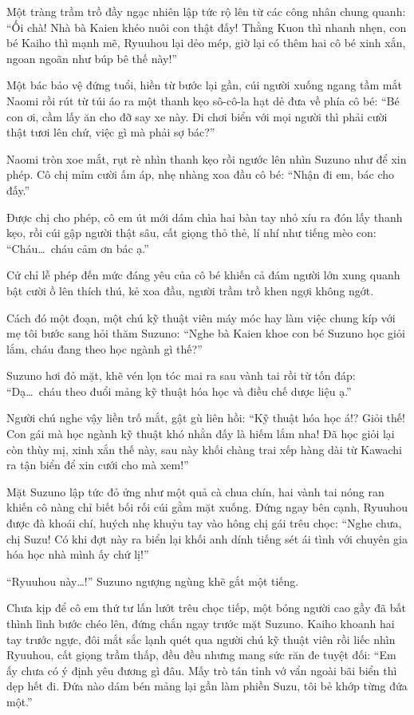 \documentclass[../main.tex]{subfiles}
\begin{document}
Một tràng trầm trồ đầy ngạc nhiên lập tức rộ lên từ các công nhân chung quanh: ``Ối chà! Nhà bà Kaien khéo nuôi con thật đấy! Thằng Kuon thì nhanh nhẹn, con bé Kaiho thì mạnh mẽ, Ryuuhou lại dẻo mép, giờ lại có thêm hai cô bé xinh xắn, ngoan ngoãn như búp bê thế này!''

Một bác bảo vệ đứng tuổi, hiền từ bước lại gần, cúi người xuống ngang tầm mắt Naomi rồi rút từ túi áo ra một thanh kẹo sô-cô-la hạt dẻ đưa về phía cô bé: ``Bé con ơi, cầm lấy ăn cho đỡ say xe này. Đi chơi biển với mọi người thì phải cười thật tươi lên chứ, việc gì mà phải sợ bác?''

Naomi tròn xoe mắt, rụt rè nhìn thanh kẹo rồi ngước lên nhìn Suzuno như để xin phép. Cô chị mỉm cười ấm áp, nhẹ nhàng xoa đầu cô bé: ``Nhận đi em, bác cho đấy.''

Được chị cho phép, cô em út mới dám chìa hai bàn tay nhỏ xíu ra đón lấy thanh kẹo, rồi cúi gập người thật sâu, cất giọng thỏ thẻ, lí nhí như tiếng mèo con: ``Cháu\dots\ cháu cảm ơn bác ạ.''

Cử chỉ lễ phép đến mức đáng yêu của cô bé khiến cả đám người lớn xung quanh bật cười ồ lên thích thú, kẻ xoa đầu, người trầm trồ khen ngợi không ngớt.

Cách đó một đoạn, một chú kỹ thuật viên máy móc hay làm việc chung kíp với mẹ tôi bước sang hỏi thăm Suzuno: ``Nghe bà Kaien khoe con bé Suzuno học giỏi lắm, cháu đang theo học ngành gì thế?''

Suzuno hơi đỏ mặt, khẽ vén lọn tóc mai ra sau vành tai rồi từ tốn đáp: ``Dạ\dots\ cháu theo đuổi mảng kỹ thuật hóa học và điều chế dược liệu ạ.''

Người chú nghe vậy liền trố mắt, gật gù liên hồi: ``Kỹ thuật hóa học á!? Giỏi thế! Con gái mà học ngành kỹ thuật khó nhằn đấy là hiếm lắm nha! Đã học giỏi lại còn thùy mị, xinh xắn thế này, sau này khối chàng trai xếp hàng dài từ Kawachi ra tận biển để xin cưới cho mà xem!''

Mặt Suzuno lập tức đỏ ửng như một quả cà chua chín, hai vành tai nóng ran khiến cô nàng chỉ biết bối rối cúi gằm mặt xuống. Đứng ngay bên cạnh, Ryuuhou được đà khoái chí, huých nhẹ khuỷu tay vào hông chị gái trêu chọc: ``Nghe chưa, chị Suzu! Có khi đợt này ra biển lại khối anh dính tiếng sét ái tình với chuyên gia hóa học nhà mình ấy chứ lị!''

``Ryuuhou này\dots!'' Suzuno ngượng ngùng khẽ gắt một tiếng.

Chưa kịp để cô em thứ tư lấn lướt trêu chọc tiếp, một bóng người cao gầy đã bất thình lình bước chéo lên, đứng chắn ngay trước mặt Suzuno. Kaiho khoanh hai tay trước ngực, đôi mắt sắc lạnh quét qua người chú kỹ thuật viên rồi liếc nhìn Ryuuhou, cất giọng trầm thấp, đều đều nhưng mang sức răn đe tuyệt đối: ``Em ấy chưa có ý định yêu đương gì đâu. Mấy trò tán tỉnh vớ vẩn ngoài bãi biển thì dẹp hết đi. Đứa nào dám bén mảng lại gần làm phiền Suzu, tôi bẻ khớp từng đứa một.''
\end{document}
